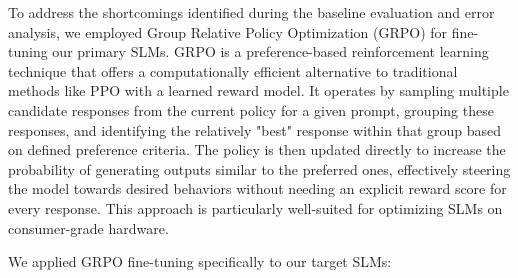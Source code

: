 \documentclass[11pt]{article}
\begin{document}
To address the shortcomings identified during the baseline evaluation and error analysis, we employed Group Relative Policy Optimization (GRPO) for fine-tuning our primary SLMs. GRPO is a preference-based reinforcement learning technique that offers a computationally efficient alternative to traditional methods like PPO with a learned reward model. It operates by sampling multiple candidate responses from the current policy for a given prompt, grouping these responses, and identifying the relatively "best" response within that group based on defined preference criteria. The policy is then updated directly to increase the probability of generating outputs similar to the preferred ones, effectively steering the model towards desired behaviors without needing an explicit reward score for every response. This approach is particularly well-suited for optimizing SLMs on consumer-grade hardware.


We applied GRPO fine-tuning specifically to our target SLMs:
\end{document}
